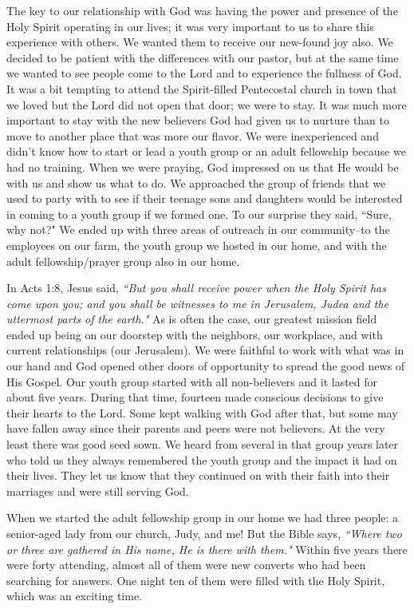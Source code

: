 \documentclass[oneside,12pt]{book}
\begin{document}
The key to our relationship with God was having the power and presence of the Holy Spirit operating in our lives; it was very important to us to share this experience with others. We wanted them to receive our new-found joy also. We decided to be patient with the differences with our pastor, but at the same time we wanted to see people come to the Lord and to experience the fullness of God. It was a bit tempting to attend the Spirit-filled Pentecostal church in town that we loved but the Lord did not open that door; we were to stay. It was much more important to stay with the new believers God had given us to nurture than to move to another place that was more our flavor. We were inexperienced and didn't know how to start or lead a youth group or an adult fellowship because we had no training. When we were praying, God impressed on us that He would be with us and show us what to do. We approached the group of friends that we used to party with to see if their teenage sons and daughters would be interested in coming to a youth group if we formed one. To our surprise they said, ``Sure, why not?" We ended up with three areas of outreach in our community--to the employees on our farm, the youth group we hosted in our home, and with the adult fellowship/prayer group also in our home.

In Acts 1:8, Jesus said, \textit{``But you shall receive power when the Holy Spirit has come upon you; and you shall be witnesses to me in Jerusalem, Judea and the uttermost parts of the earth."} As is often the case, our greatest mission field ended up being on our doorstep with the neighbors, our workplace, and with current relationships (our Jerusalem). We were faithful to work with what was in our hand and God opened other doors of opportunity to spread the good news of His Gospel. Our youth group started with all non-believers and it lasted for about five years. During that time, fourteen made conscious decisions to give their hearts to the Lord. Some kept walking with God after that, but some may have fallen away since their parents and peers were not believers. At the very least there was good seed sown. We heard from several in that group years later who told us they always remembered the youth group and the impact it had on their lives. They let us know that they continued on with their faith into their marriages and were still serving God.

When we started the adult fellowship group in our home we had three people: a senior-aged lady from our church, Judy, and me! But the Bible says, \textit{``Where two or three are gathered in His name, He is there with them."} Within five years there were forty attending, almost all of them were new converts who had been searching for answers. One night ten of them were filled with the Holy Spirit, which was an exciting time. 
\end{document}
